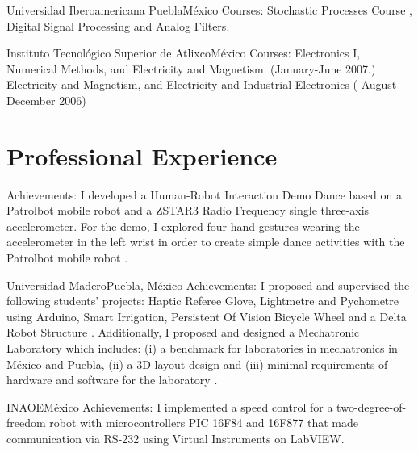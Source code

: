 \documentclass[10pt,a4paper,roman]{moderncv}
\begin{document}
{Universidad Iberoamericana Puebla}{M\'exico}{}
{Courses: Stochastic Processes Course
\href{https://sites.google.com/site/perezxochicale/stochastic-processes-course}{\faExternalLink},
Digital Signal Processing
\href{https://sites.google.com/site/perezxochicale/digital-signal-processing-course}{\faExternalLink}
and Analog Filters.
}

{Instituto Tecnol\'ogico Superior de Atlixco}{M\'exico}{}
{Courses: Electronics I, Numerical Methods, and Electricity and Magnetism. (January-June 2007.)
Electricity and Magnetism, and Electricity and Industrial Electronics ( August-December 2006)
}


\section{Professional Experience}

{Achievements: I developed a Human-Robot Interaction Demo Dance based on 
a Patrolbot mobile robot and a ZSTAR3 Radio Frequency single three-axis accelerometer.
For the demo, I explored four hand gestures wearing the accelerometer in the left wrist
in order to create simple dance activities with the Patrolbot mobile robot
\href{https://sites.google.com/site/perezxochicale/projects/demodance}{\faExternalLink}.
}

{Universidad Madero}{Puebla, M\'exico}{}
{Achievements:
I proposed and supervised the following students' projects: Haptic Referee Glove,
 Lightmetre and Pychometre using Arduino, Smart Irrigation, Persistent Of Vision Bicycle Wheel
 and a Delta Robot Structure 
\href{https://sites.google.com/site/perezxochicaleprojects/studentprojects}{\faExternalLink}.
Additionally, I proposed and designed a Mechatronic Laboratory which includes: 
(i) a benchmark for laboratories in mechatronics in M\'exico and Puebla, 
(ii) a 3D layout design and 
(iii) minimal requirements of hardware and software for the laboratory
 \href{https://sites.google.com/site/perezxochicaleprojects/mechatronicslaboratorydesign}{\faExternalLink}.
}

{INAOE}{M\'exico}{}
{Achievements:
I implemented a speed control for a two-degree-of-freedom robot with microcontrollers
PIC 16F84 and 16F877 that made communication via RS-232 using Virtual Instruments on LabVIEW.}
\end{document}
